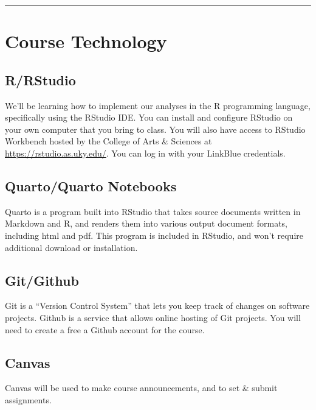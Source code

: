 \documentclass[
  letterpaper,
  DIV=11,
  numbers=noendperiod]{scrartcl}
\begin{document}
\begin{center}\rule{0.5\linewidth}{0.5pt}\end{center}

\hypertarget{course-technology}{%
\section{Course Technology}\label{course-technology}}

\hypertarget{rrstudio}{%
\subsection{R/RStudio}\label{rrstudio}}

We'll be learning how to implement our analyses in the R programming
language, specifically using the RStudio IDE. You can install and
configure RStudio on your own computer that you bring to class. You will
also have access to RStudio Workbench hosted by the College of Arts \&
Sciences at \url{https://rstudio.as.uky.edu/}. You can log in with your
LinkBlue credentials.

\hypertarget{quartoquarto-notebooks}{%
\subsection{Quarto/Quarto Notebooks}\label{quartoquarto-notebooks}}

Quarto is a program built into RStudio that takes source documents
written in Markdown and R, and renders them into various output document
formats, including html and pdf. This program is included in RStudio,
and won't require additional download or installation.

\hypertarget{gitgithub}{%
\subsection{Git/Github}\label{gitgithub}}

Git is a ``Version Control System'' that lets you keep track of changes
on software projects. Github is a service that allows online hosting of
Git projects. You will need to create a free a Github account for the
course.

\hypertarget{canvas}{%
\subsection{Canvas}\label{canvas}}

Canvas will be used to make course announcements, and to set \& submit
assignments.
\end{document}
